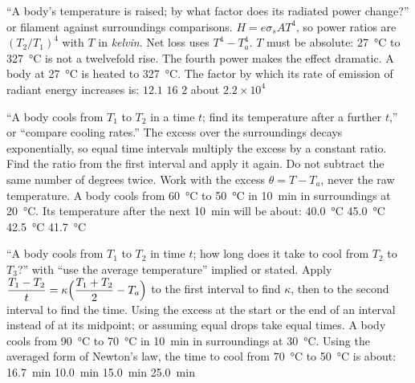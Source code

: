 {``A body's temperature is raised; by what factor does its radiated power change?'' or filament
against surroundings comparisons.}
{$H=e\sigma_{\!s}AT^4$, so power ratios are $(T_2/T_1)^4$ with $T$ in \emph{kelvin}. Net loss uses
$T^4-T_a^4$.}
{$T$ must be absolute: \SI{27}{\celsius} to \SI{327}{\celsius} is not a twelvefold rise. The fourth
power makes the effect dramatic.}
{A body at \SI{27}{\celsius} is heated to \SI{327}{\celsius}. The factor by which its rate of emission
of radiant energy increases is:}
{$12.1$}
{$16$}
{$2$}
{about $2.2\times10^4$}

{``A body cools from $T_1$ to $T_2$ in a time $t$; find its temperature after a further $t$,'' or
``compare cooling rates.''}
{The excess over the surroundings decays exponentially, so equal time intervals multiply the excess by
a constant ratio. Find the ratio from the first interval and apply it again.}
{Do not subtract the same number of degrees twice. Work with the excess $\theta=T-T_a$, never the raw
temperature.}
{A body cools from \SI{60}{\celsius} to \SI{50}{\celsius} in \SI{10}{min} in surroundings at
\SI{20}{\celsius}. Its temperature after the next \SI{10}{min} will be about:}
{\SI{40.0}{\celsius}}
{\SI{45.0}{\celsius}}
{\SI{42.5}{\celsius}}
{\SI{41.7}{\celsius}}

{``A body cools from $T_1$ to $T_2$ in time $t$; how long does it take to cool from $T_2$ to $T_3$?''
with ``use the average temperature'' implied or stated.}
{Apply $\dfrac{T_1-T_2}{t}=\kappa\Bigl(\dfrac{T_1+T_2}{2}-T_a\Bigr)$ to the first interval to find
$\kappa$, then to the second interval to find the time.}
{Using the excess at the start or the end of an interval instead of at its midpoint; or assuming equal
drops take equal times.}
{A body cools from \SI{90}{\celsius} to \SI{70}{\celsius} in \SI{10}{min} in surroundings at
\SI{30}{\celsius}. Using the averaged form of Newton's law, the time to cool from \SI{70}{\celsius} to
\SI{50}{\celsius} is about:}
{\SI{16.7}{min}}
{\SI{10.0}{min}}
{\SI{15.0}{min}}
{\SI{25.0}{min}}


